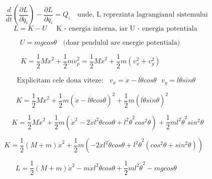 \documentclass[12pt]{article}
\begin{document}
\begin{equation}
\frac{d}{dt} (\frac{\partial L}{\partial \dot q_i})  -  \frac{\partial L}{\partial q_i}  = Q_i   \text{~~~unde, L reprezinta lagrangianul sistemului~~~~~~~~~}
\end{equation}
\flushleft
\begin{equation}
L = K - U \text{~~~~K - energia interna, iar U - energia potentiala}{~~~~~~~~~~~~~~~}
\end{equation}


\begin{equation}
U =  mg cos \theta ~~~~\text {(doar pendulul are energie potentiala)}{~~~~~~~~~~~~~~~~~~~~~~}
\end{equation}

\begin{equation}
K = \frac{1}{2}M \dot x ^ 2 + \frac{1}{2}m \dot v_p ^ 2  =  \frac{1}{2}M \dot x ^ 2 + \frac{1}{2}m( v_x^2 +  v_y^2) {~~~~~~~~~~~~~~~~~~~~~~~~~~~~~~~~~~}
\end{equation}

\begin{equation}
\text{Explicitam cele doua viteze: ~} ~ v_x = \dot x - l  \dot \theta cos \theta ~~~ v_y = l \dot \theta sin \theta{~~~~~~~~~~~~~~}
\end{equation}


\begin{equation}
K = \frac{1}{2}M \dot x^2 + \frac{1}{2} m (\dot x - l  \dot \theta cos \theta) ^ 2 + \frac{1}{2} m (l \dot \theta sin \theta) ^ 2 {~~~~~~~~~~~~~~~~~~~~~~~~~~~~~~~~}
\end{equation}

\begin{equation}
K =  \frac{1}{2}M\dot x^2 + \frac{1}{2}m(\dot x ^ 2 - 2 \dot x l^2 \dot \theta cos \theta + l ^2 \dot \theta ^2 cos ^ 2 \theta) + \frac{1}{2}m l^2 \dot \theta ^ 2 sin^2 \theta {~~~~~~~~~~~~}
\end{equation}

\begin{equation}
K = \frac{1}{2}(M+m)\dot x^2 + \frac{1}{2}m(- 2 \dot x l^2 \dot \theta cos \theta + l ^ 2 \dot \theta ^2(cos^2 \theta + sin^2 \theta)){~~~~~~~~~~~~~~~~~}
\end{equation}

\begin{equation}
L = \frac{1}{2}(M+m)\dot x^2 - m \dot x l^2 \dot \theta cos \theta + \frac{1}{2} ml ^ 2 \dot \theta ^2 -mg cos \theta {~~~~~~~~~~~~~~~~~~~~~~~~~~~}
\end{equation}\newline
\end{document}
